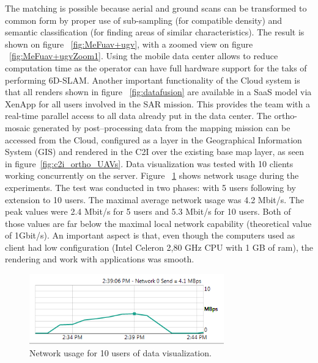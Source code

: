 \documentclass{article}
\begin{document}
The matching is possible because aerial and ground scans can be transformed to common form by proper use of sub-sampling (for compatible density) and semantic classification (for finding areas of similar characteristics).
The result is shown on figure ~\ref{fig:MeFuav+ugv}, with a zoomed view on figure ~\ref{fig:MeFuav+ugvZoom1}.
Using the mobile data center allows to reduce computation time as the operator can have full hardware support for the taks of performing 6D-SLAM.
Another important functionality of the Cloud system is that all renders shown in figure ~\ref{fig:datafusion} are available in a SaaS model via XenApp for all users involved in the SAR mission.
This provides the team with a real-time parallel access to all data already put in the data center.
The ortho-mosaic generated by post--processing data from the mapping mission can be accessed from the Cloud, configured as a layer in the Geographical Information System (GIS) and rendered in the C2I over the existing base map layer, as seen in figure~\ref{fig:c2i_ortho_UAVs}.
Data visualization was tested with 10 clients working concurrently on the server.
Figure ~\ref{fig:networkstats} shows network usage during the experiments.
The test was conducted in two phases: with 5 users following by extension to 10 users.
The maximal average network usage was 4.2 Mbit/s.
The peak values were 2.4 Mbit/s for 5 users and 5.3 Mbit/s for 10 users. Both of those values are far below the maximal local network capability (theoretical value of 1Gbit/s).
An important aspect is that, even though the computers used as client had low configuration (Intel Celeron 2,80 GHz CPU with 1 GB of ram), the rendering and work with applications was smooth.
\begin{figure} [h]
	\centering
	\includegraphics[width=0.75\textwidth]{ROB-15-0035_fig33.png}
	\caption{Network usage for 10 users of data visualization.}
	\label{fig:networkstats}
\end{figure}
\end{document}
